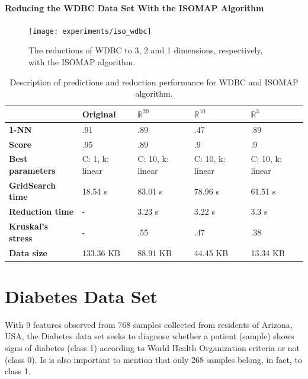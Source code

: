 \newpage
\paragraph{Reducing the WDBC Data Set With the ISOMAP Algorithm}

\begin{figure}[H]
	\centering
	\captionsetup{justification=centering}
	\texttt{[image: experiments/iso\_wdbc]}
	\caption{The reductions of WDBC to 3, 2 and 1 dimensions, respectively, with the ISOMAP algorithm.}
	\label{fig:dswdbciso}
\end{figure}

\begin{table}[H]
	\centering
	
	\begin{tabular}{|p{.15\linewidth}|p{.15\linewidth}|p{.15\linewidth}|p{.15\linewidth}|p{.15\linewidth}|}
		\hline
		& \textbf{Original} & $\mathbb{R}^{20}$ & $\mathbb{R}^{10}$ & $\mathbb{R}^{3}$ \\\hline
		\textbf{1-NN} & .91 & .89 & .47 & .89 \\\hline
		\textbf{Score} & .95 & .89 & .9 & .9 \\\hline
		\textbf{Best parameters} & C: 1, k: linear & C: 10, k: linear & C: 10, k: linear & C: 10, k: linear \\\hline
		\textbf{GridSearch time} & 18.54 s & 83.01 s & 78.96 s & 61.51 s \\\hline
		\textbf{Reduction time} & - & 3.23 s & 3.22 s & 3.3 s \\\hline
		\textbf{Kruskal's stress} & - & .55 & .47 & .38 \\\hline
		\textbf{Data size} & 133.36 KB & 88.91 KB & 44.45 KB & 13.34 KB \\\hline
	\end{tabular}
	\captionsetup{justification=centering}
	\caption{Description of predictions and reduction performance for WDBC and ISOMAP algorithm.}
\end{table}

\newpage
\section{Diabetes Data Set}

With 9 features observed from 768 samples collected from residents of Arizona, USA, the Diabetes data set seeks to diagnose whether a patient (sample) shows signs of diabetes (class 1) according to World Health Organization criteria or not (class 0). Is is also important to mention that only 268 samples belong, in fact, to class 1.

